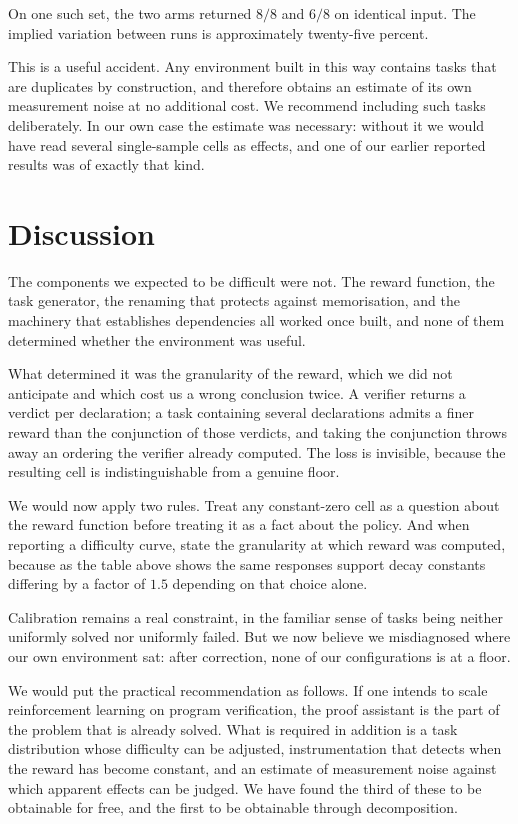 \documentclass[11pt]{article}
\begin{document}
On one such set, the two arms returned $8/8$ and $6/8$ on identical input. The
implied variation between runs is approximately twenty-five percent.

This is a useful accident. Any environment built in this way contains tasks that
are duplicates by construction, and therefore obtains an estimate of its own
measurement noise at no additional cost. We recommend including such tasks
deliberately. In our own case the estimate was necessary: without it we would
have read several single-sample cells as effects, and one of our earlier reported
results was of exactly that kind.

\section{Discussion}

The components we expected to be difficult were not. The reward function, the
task generator, the renaming that protects against memorisation, and the
machinery that establishes dependencies all worked once built, and none of them
determined whether the environment was useful.

What determined it was the granularity of the reward, which we did not
anticipate and which cost us a wrong conclusion twice. A verifier returns a
verdict per declaration; a task containing several declarations admits a finer
reward than the conjunction of those verdicts, and taking the conjunction throws
away an ordering the verifier already computed. The loss is invisible, because
the resulting cell is indistinguishable from a genuine floor.

We would now apply two rules. Treat any constant-zero cell as a question about
the reward function before treating it as a fact about the policy. And when
reporting a difficulty curve, state the granularity at which reward was
computed, because as the table above shows the same responses support decay
constants differing by a factor of $1.5$ depending on that choice alone.

Calibration remains a real constraint, in the familiar sense of tasks being
neither uniformly solved nor uniformly failed. But we now believe we misdiagnosed
where our own environment sat: after correction, none of our configurations is at
a floor.

We would put the practical recommendation as follows. If one intends to scale
reinforcement learning on program verification, the proof assistant is the part
of the problem that is already solved. What is required in addition is a task
distribution whose difficulty can be adjusted, instrumentation that detects when
the reward has become constant, and an estimate of measurement noise against
which apparent effects can be judged. We have found the third of these to be
obtainable for free, and the first to be obtainable through decomposition.
\end{document}

